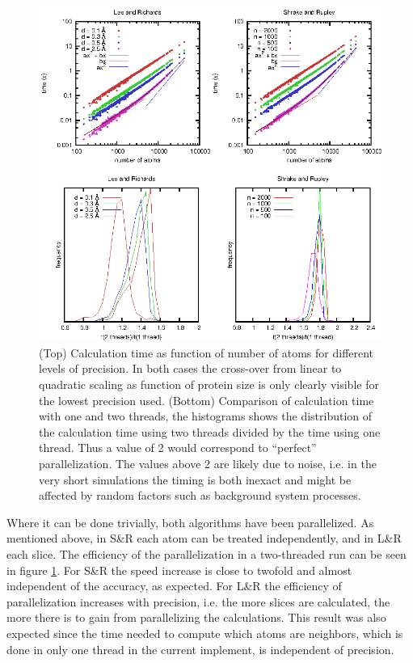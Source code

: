 \documentclass[a4paper,11pt]{article}
\begin{document}
\begin{figure}
  \begin{center}
  \includegraphics{fig/time}
  \caption{(Top) Calculation time as function of number of atoms for
    different levels of precision. In both cases the cross-over from
    linear to quadratic scaling as function of protein size is only
    clearly visible for the lowest precision used.  (Bottom)
    Comparison of calculation time with one and two threads, the
    histograms shows the distribution of the calculation time using
    two threads divided by the time using one thread. Thus a value of
    2 would correspond to ``perfect'' parallelization. The values
    above 2 are likely due to noise, i.e. in the very short
    simulations the timing is both inexact and might be affected by
    random factors such as background system processes.
    \label{fig:time}}
  \end{center}
\end{figure}

Where it can be done trivially, both algorithms have been
parallelized. As mentioned above, in S\&R each atom can be treated
independently, and in L\&R each slice. The efficiency of the
parallelization in a two-threaded run can be seen in figure
\ref{fig:time}. For S\&R the speed increase is close to twofold and
almost independent of the accuracy, as expected. For L\&R the
efficiency of parallelization increases with precision, i.e. the more
slices are calculated, the more there is to gain from parallelizing
the calculations. This result was also expected since the time needed
to compute which atoms are neighbors, which is done in only one thread
in the current implement, is independent of precision.
\end{document}
